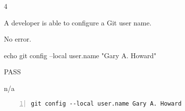 \begin{description}[align=right,leftmargin=3.2cm,labelindent=3.0cm]
\item[Step:] 4
\item[Confirm:] A developer is able to configure a Git user name.
\item[Expectation:] No error.
\item[Command:] echo git  config --local user.name "Gary A. Howard"
\item[Test Result:] PASS
\item[Evidence:] n/a
\end{description}
\begin{lstlisting}[numbers=left]
git config --local user.name Gary A. Howard

\end{lstlisting}
